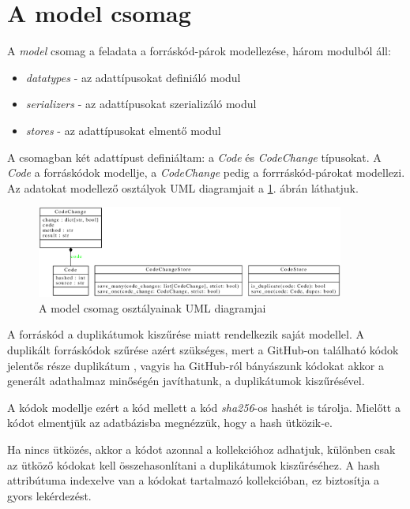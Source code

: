 \section{A model csomag}
\label{sec:model}

A \emph{model} csomag a feladata a forráskód-párok modellezése, három modulból áll:

\begin{itemize}
	\item \emph{datatypes} - az adattípusokat definiáló modul
	\item \emph{serializers} - az adattípusokat szerializáló modul
	\item \emph{stores} - az adattípusokat elmentő modul
\end{itemize}

A csomagban két adattípust definiáltam: a \emph{Code} és \emph{CodeChange} típusokat.
A \emph{Code} a forráskódok modellje, a \emph{CodeChange} pedig a forrráskód-párokat modellezi.
Az adatokat modellező osztályok UML diagramjait a \ref{fig:model}. ábrán láthatjuk.

\begin{figure}[H]
	\centering
	\includegraphics[width=0.9\textwidth]{images/uml/models.eps}
	\caption{\label{fig:model}A model csomag osztályainak UML diagramjai}
\end{figure}

A forráskód a duplikátumok kiszűrése miatt rendelkezik saját modellel.
A duplikált forráskódok szűrése azért szükséges, mert a GitHub-on található kódok
jelentős része duplikátum \cite{GitHubDuplication},
vagyis ha GitHub-ról bányászunk kódokat akkor a generált adathalmaz minőségén javíthatunk,
a duplikátumok kiszűrésével.

A kódok modellje ezért a kód mellett a kód \emph{sha256}-os hashét is tárolja.
Mielőtt a kódot elmentjük az adatbázisba megnézzük, hogy a hash ütközik-e.

Ha nincs ütközés, akkor a kódot azonnal a kollekcióhoz adhatjuk,
különben csak az ütköző kódokat kell összehasonlítani a duplikátumok kiszűréséhez.
A hash attribútuma indexelve van a kódokat tartalmazó kollekcióban,
ez biztosítja a gyors lekérdezést.

